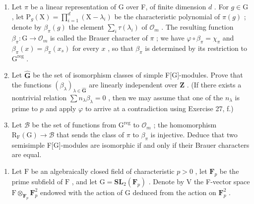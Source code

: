 \begin{enumerate}
\def\labelenumi{\alph{enumi})}
\item
  Let \(\pi\) be a linear representation of G over F, of finite dimension \(d\) . For \(g \in \mathrm{G}\) , let \(\mathrm{P}_g(\mathrm{X}) = \prod_{i=1}^d (\mathrm{X} - \lambda_i)\) be the characteristic polynomial of \(\pi(g)\) ; denote by \(\beta_{\pi}(g)\) the element \(\sum_{i} \tau(\lambda_i)\) of \(\mathcal{O}_m\) . The resulting function \(\beta_{\pi}: \mathrm{G} \to \mathcal{O}_m\) is called the Brauer character of \(\pi\) ; we have \(\varphi \circ \beta_{\pi} = \chi_{\pi}\) and \(\beta_{\pi}(x) = \beta_{\pi}(x_s)\) for every \(x\) , so that \(\beta_{\pi}\) is determined by its restriction to \(\mathrm{G}^{\mathrm{reg}}\) .
\item
  Let \(\widehat{\mathbf{G}}\) be the set of isomorphism classes of simple F{[}G{]}-modules. Prove that the functions \((\beta_{\lambda})_{\lambda \in \widehat{\mathbf{G}}}\) are linearly independent over \(\mathbf{Z}\) . (If there exists a nontrivial relation \(\sum n_{\lambda} \beta_{\lambda} = 0\) , then we may assume that one of the \(n_{\lambda}\) is prime to \(p\) and apply \(\varphi\) to arrive at a contradiction using Exercise 27, f.)
\item
  Let \(\mathcal{B}\) be the set of functions from \(\mathrm{G}^{\mathrm{reg}}\) to \(\mathcal{O}_m\) ; the homomorphism \(\mathrm{R}_{\mathrm{F}}(\mathrm{G}) \to \mathcal{B}\) that sends the class of \(\pi\) to \(\beta_{\pi}\) is injective. Deduce that two semisimple F{[}G{]}-modules are isomorphic if and only if their Brauer characters are equal.
\end{enumerate}

\begin{enumerate}
\def\labelenumi{\arabic{enumi})}
\setcounter{enumi}{29}
\tightlist
\item
  Let \(\mathrm{F}\) be an algebraically closed field of characteristic \(p > 0\) , let \(\mathbf{F}_p\) be the prime subfield of \(\mathrm{F}\) , and let \(\mathrm{G} = \mathbf{SL}_2(\mathbf{F}_p)\) . Denote by \(\mathrm{V}\) the F-vector space \(\mathrm{F} \otimes_{\mathbf{F}_p} \mathbf{F}_p^2\) endowed with the action of \(\mathrm{G}\) deduced from the action on \(\mathbf{F}_p^2\) .
\end{enumerate}

